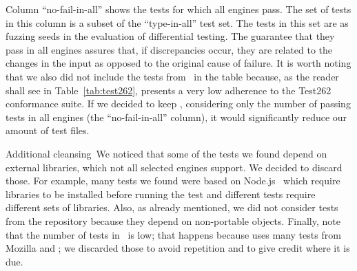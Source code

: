 \documentclass[smallextended]{svjour3}
\begin{document}
Column ``no-fail-in-all'' shows the tests for which all engines
pass. The set of tests in this column is a subset of the
``type-in-all'' test set. The tests in this set are as fuzzing seeds
in the evaluation of differential testing. The guarantee that they
pass in all engines assures that, if discrepancies occur, they are
related to the changes in the input as opposed to the original cause
of failure. It is worth noting that we also did not include the tests
from \hermes\ in the table because, as the reader shall see in
Table~\ref{tab:test262}, \hermes presents a very low adherence to the
Test262 conformance suite. If we decided to keep \hermes, considering
only the number of passing tests in all engines (the
``no-fail-in-all'' column), it would significantly reduce our amount of test files.




\lbrack{}Additional cleansing\rbrack{}~We noticed that some of the
tests we found depend on external libraries, which not all selected
engines support. We decided to discard those. For example, many tests
we found were based on Node.js~\cite{node} which require libraries to be
installed before running the test and different tests require
different sets of libraries. Also, as already mentioned, we did not
consider tests from the \chakra{} repository because they depend on
non-portable objects.  Finally, note that the number of tests in
\veight\ is low; that happens because \veight{} uses many tests from
Mozilla and \jsc; we discarded those to avoid repetition and to give
credit where it is due.
\end{document}

